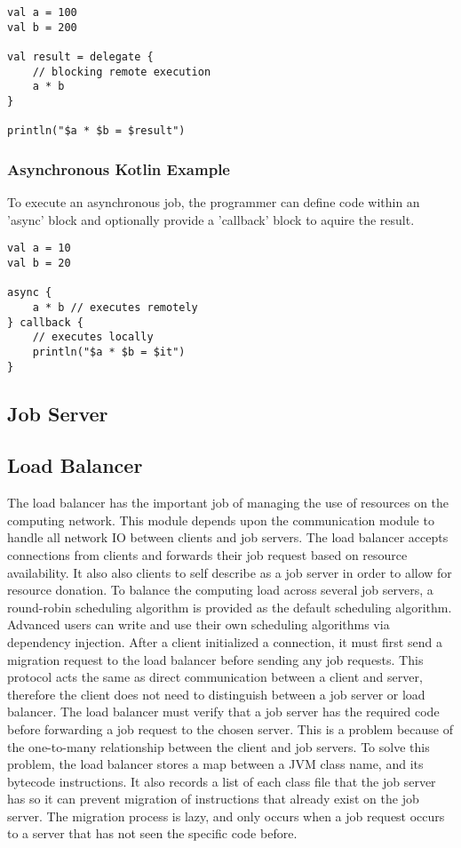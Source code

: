 \begin{lstlisting}
val a = 100
val b = 200

val result = delegate {
    // blocking remote execution
    a * b
}

println("$a * $b = $result")
\end{lstlisting}

\subsubsection{Asynchronous Kotlin Example}

To execute an asynchronous job, the programmer can define code within an
'async' block and optionally provide a 'callback' block to aquire the result.

\begin{lstlisting}
val a = 10
val b = 20

async {
    a * b // executes remotely
} callback {
    // executes locally
    println("$a * $b = $it")
}
\end{lstlisting}

\subsection{Job Server}\label{subsec:jobServer}

\subsection{Load Balancer}\label{subsec:modules}

The load balancer has the important job of managing the use of resources
on the computing network.
This module depends upon the communication module to handle all network IO
between clients and job servers.
The load balancer accepts connections from clients and forwards their job
request based on resource availability.
It also also clients to self describe as a job server in order to allow for
resource donation.
To balance the computing load across several job servers, a round-robin
scheduling algorithm is provided as the default scheduling algorithm.
Advanced users can write and use their own scheduling algorithms via dependency
injection.
After a client initialized a connection, it must first send a migration request
to the load balancer before sending any job requests.
This protocol acts the same as direct communication between a client and server,
therefore the client does not need to distinguish between a job server or load
balancer.
The load balancer must verify that a job server has the required
code before forwarding a job request to the chosen server.
This is a problem because of the one-to-many relationship between the client
and job servers.
To solve this problem, the load balancer stores a map between
a JVM class name, and its bytecode instructions.
It also records a list of each class file that the job server has so it can
prevent migration of instructions that already exist on the job server.
The migration process is lazy, and only occurs when a job request
occurs to a server that has not seen the specific code before.
